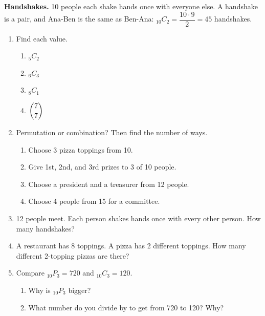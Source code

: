 \documentclass[11pt]{article}
\begin{document}
\vspace{0.8em}
\textbf{Handshakes.} 10 people each shake hands once with everyone else. A handshake is a pair, and Ana-Ben is the same as Ben-Ana:
\qquad ${}_{10}C_2 = \dfrac{10 \cdot 9}{2} = 45$ handshakes.

\partner

\newpage
\begin{enumerate}

\item Find each value.
\begin{enumerate}[itemsep=1.4em]
  \item ${}_5C_2$ 
  \item ${}_6C_3$ 
  \item ${}_8C_1$ 
  \item $\dbinom{7}{7}$ 
\end{enumerate}
\work{1em}

\item Permutation or combination? Then find the number of ways.
\begin{enumerate}[itemsep=1.8em]
  \item Choose 3 pizza toppings from 10. 
  \item Give 1st, 2nd, and 3rd prizes to 3 of 10 people. 
  \item Choose a president and a treasurer from 12 people. 
  \item Choose 4 people from 15 for a committee. 
\end{enumerate}
\work{1em}

\item 12 people meet. Each person shakes hands once with every other person. How many handshakes?

\work{3em}

\newpage
\item A restaurant has 8 toppings. A pizza has 2 different toppings. How many different 2-topping pizzas are there?

\work{3em}

\item Compare ${}_{10}P_3 = 720$ and ${}_{10}C_3 = 120$.
\begin{enumerate}[itemsep=1em]
  \item Why is ${}_{10}P_3$ bigger? 
  \work{1.5em}
  \item What number do you divide by to get from 720 to 120? Why? 
\end{enumerate}
\work{2em}


\end{enumerate}
\end{document}
